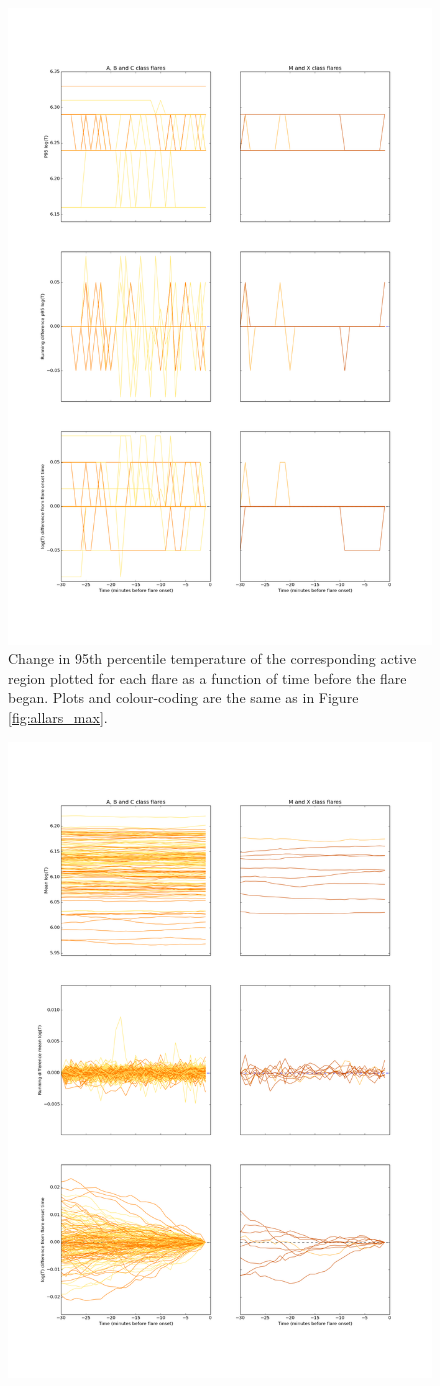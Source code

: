 \documentclass[referee,a4paper,12pt]{swsc}
\begin{document}
\begin{linenumbers}
\begin{figure}
		\includegraphics[width=0.7\columnwidth]{tempplots_p95/allars.png}
	\caption{Change in 95th percentile temperature of the corresponding active region plotted for each flare as a function of time before the flare began. Plots and colour-coding are the same as in Figure \ref{fig:allars_max}.}
	\label{fig:allars_p95}
\end{figure}
\begin{figure}
	\centering
		\includegraphics[width=0.7\columnwidth]{tempplotsmean/allars.png}

\end{figure}
\end{linenumbers}
\end{document}
